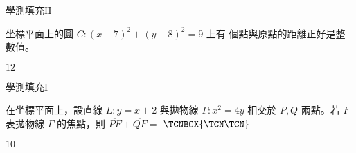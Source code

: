 \begin{QUESTIONS}
\begin{QUESTION}
\begin{ExamInfo}{93}{學測}{填充}{H}
        \end{ExamInfo}
        \begin{ExamAnsRateInfo}{21}{37}{18}{8}
        \end{ExamAnsRateInfo}
        \begin{QBODY}
            坐標平面上的圓 $C:(x-7)^2+(y-8)^2=9$ 上有 
            \TCNBOX{\TCN\TCN} 個點與原點的距離正好是整數值。
        \end{QBODY}
        \begin{QFROMS}
        \end{QFROMS}
        \begin{QTAGS}\end{QTAGS}
        \begin{QANS}
            $12$
        \end{QANS}
        \begin{QSOLLIST}
        \end{QSOLLIST}
        \begin{QEMPTYSPACE}
        \end{QEMPTYSPACE}
    \end{QUESTION}
    \begin{QUESTION}
        \begin{ExamInfo}{93}{學測}{填充}{I}
        \end{ExamInfo}
        \begin{ExamAnsRateInfo}{19}{47}{7}{3}
        \end{ExamAnsRateInfo}
        \begin{QBODY}
            在坐標平面上，設直線 $L:y=x+2$ 與拋物線 $\Gamma :x^2=4y$ 相交於 $P,Q$ 兩點。若 $F$ 表拋物線 $\Gamma$ 的焦點，則 $\overline{PF}+\overline{QF}=$ 
            $\TCNBOX{\TCN\TCN}$
        \end{QBODY}
        \begin{QFROMS}
        \end{QFROMS}
        \begin{QTAGS}\end{QTAGS}
        \begin{QANS}
            $10$
        \end{QANS}
        \begin{QSOLLIST}
        \end{QSOLLIST}
        \begin{QEMPTYSPACE}
        \end{QEMPTYSPACE}
    \end{QUESTION}
\end{QUESTIONS}
